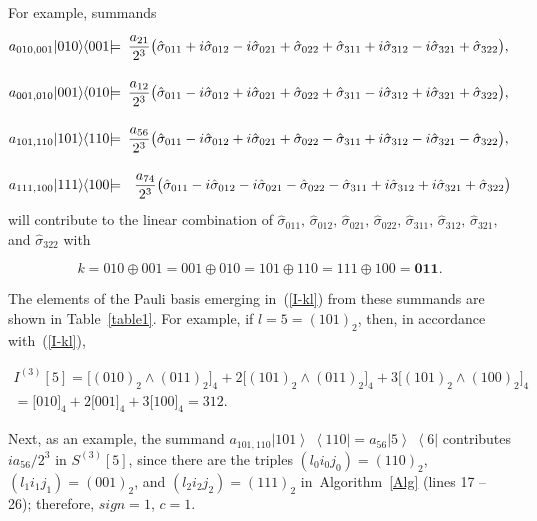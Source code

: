 \documentclass[12pt,a4paper,twoside]{article}      %
\newcommand{\ketbra}[2]{{\ensuremath {\left|#1\right\rangle\!\;\!\!\left\langle#2\right|}}}
\begin{document}
For example, summands
\begin{eqnarray}\label{}
a_{010,001}\ketbra{010}{001}&\!\!\!=\!\!\!& \frac{a_{21}}{2^3}\big( \hat{\sigma}_{011}+ i\hat{\sigma}_{012}- i\hat{\sigma}_{021}+ \hat{\sigma}_{022}+ \hat{\sigma}_{311}+ i\hat{\sigma}_{312}- i\hat{\sigma}_{321}+
\hat{\sigma}_{322} \big),\vphantom{\int\limits_a}
\nonumber\\
a_{001,010}\ketbra{001}{010}&\!\!\!=\!\!\!& \frac{a_{12}}{2^3}\big( \hat{\sigma}_{011}- i\hat{\sigma}_{012}+ i\hat{\sigma}_{021}+ \hat{\sigma}_{022}+ \hat{\sigma}_{311}- i\hat{\sigma}_{312}+ i\hat{\sigma}_{321}+
\hat{\sigma}_{322} \big),\vphantom{\int\limits_a}
\nonumber\\
a_{101,110}\ketbra{101}{110}&\!\!\!=\!\!\!& \frac{a_{56}}{2^3}\big( \hat{\sigma}_{011}- i\hat{\sigma}_{012}+ i\hat{\sigma}_{021}+ \hat{\sigma}_{022}- \hat{\sigma}_{311}+ i\hat{\sigma}_{312}- i\hat{\sigma}_{321}-
\hat{\sigma}_{322} \big),\vphantom{\int\limits_a}
\nonumber\\
a_{111,100}\ketbra{111}{100}&\!\!\!=\!\!\!& \frac{a_{74}}{2^3}\big( \hat{\sigma}_{011}- i\hat{\sigma}_{012}- i\hat{\sigma}_{021}- \hat{\sigma}_{022}- \hat{\sigma}_{311}+ i\hat{\sigma}_{312}+ i\hat{\sigma}_{321}+
\hat{\sigma}_{322} \big)\vphantom{\int}
\nonumber
\end{eqnarray}
will contribute to the linear combination of $\hat{\sigma}_{011},\, \hat{\sigma}_{012},\, \hat{\sigma}_{021},\, \hat{\sigma}_{022},\, \hat{\sigma}_{311},\, \hat{\sigma}_{312},\, \hat{\sigma}_{321},$ and $\hat{\sigma}_{322}$ with

\begin{equation}\label{}
k= 010\oplus001= 001\oplus010= 101\oplus110= 111\oplus100=\mathbf{011}.\nonumber
\end{equation}

\vspace{1ex}\noindent
The elements of the Pauli basis emerging in~(\ref{I-kl}) from these summands are shown in Table~\ref{table1}. For example, if $l=5=(101)_2$, then, in accordance with~(\ref{I-kl}),

\begin{multline}\label{}
I^{(3)}[5]= \big[(010)_2\wedge(011)_2\big]_4+ 2\big[(101)_2\wedge(011)_2\big]_4+ 3\big[(101)_2\wedge(100)_2\big]_4\\
=\big[010\big]_4+ 2\big[001\big]_4+ 3\big[100\big]_4= 312.\quad
\nonumber
\end{multline}

\vspace{1ex}\noindent
Next, as an example, the summand $a_{101,110}\ketbra{101}{110}=a_{56}\ketbra{5}{6}$ contributes $ia_{56}/2^3$ in $S^{(3)}[5]$, since there are the triples $(l_0i_0j_0)=(110)_2$, $(l_1i_1j_1)=(001)_2$, and $(l_2i_2j_2)=(111)_2$ in~Algorithm~\ref{Alg}\! (lines 17 -- 26); therefore, $sign=1$, $c=1$.
\end{document}
